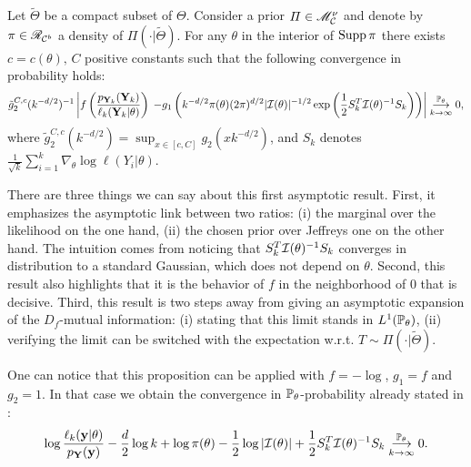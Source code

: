\begin{prop}
    Let $\tilde\Theta$ be a compact subset of $\Theta$.
    Consider a prior $\varPi\in\sM^\nu_\cC$ and denote by $\pi\in\sR_{\cC^b}$ a density of $\varPi(\cdot|\tilde\Theta)$.%
    For any $\theta$ in the interior of $\Supp\pi$ there exists $c=c(\theta),\,C$ positive constants such that the following convergence in probability holds:
    \begin{equation}
        \label{eq:cvinproba}
        \tilde g_2^{C,c}(k^{-d/2})^{-1}\left| f\left(\frac{p_{\mbf Y_k}(\mbf Y_k)}{\ell_k(\mbf Y_k|\theta)}\right) \right.            \left. - g_1\left(k^{-d/2}\pi(\theta)(2\pi)^{d/2}|\cI(\theta)|^{-1/2}\exp\left(\frac{1}{2}S_k^T\cI(\theta)^{-1}S_k \right)\right) \right| %
                \conv[\PP_{\theta}]{k\rightarrow\infty} 0,
    \end{equation}
    where $\tilde g_2^{C,c}(k^{-d/2})=\sup_{x\in[c,C]} g_2(xk^{-d/2})$, and $S_k$ denotes $\frac{1}{\sqrt{k}}\sum_{i=1}^k\nabla_\theta\log\ell(Y_i|\theta)$.
\end{prop}


There are three things we can say about this first asymptotic result. %
First, it emphasizes the asymptotic link {between two ratios: (i) the marginal over the likelihood on the one hand, (ii) the chosen prior over Jeffreys one on the other hand.}  
The intuition comes from noticing that $S_k^T\cI(\theta)^{-1}S_k$ converges in distribution to a standard Gaussian, which does not depend on $\theta$.
Second, 
this result also highlights that it is the behavior of $f$ in the neighborhood of $0$ that is decisive.
Third, this result is two steps away from giving an asymptotic expansion of the $D_f$-mutual information: (i) stating that this limit stands in $L^1(\PP_{\theta})$, (ii) verifying the limit can be switched with the expectation w.r.t. $T\sim\varPi(\cdot|\tilde\Theta)$.




One can notice that this proposition can be applied with $f=-\log$, $g_1=f$ and $g_2=1$. 
In that case we obtain the convergence in $\PP_\theta$-probability already stated in \cite{clarke_information-theoretic_1990}:
    \begin{equation}
        \log\frac{\ell_k(\mbf y|\theta)}{p_{\mbf Y}(\mbf y)} - \frac{d}{2}\log k + \log\pi(\theta) - \frac{1}{2}\log|\cI(\theta)| +\frac{1}{2}S_k^T\cI(\theta)^{-1}S_k  \conv[\PP_\theta]{k\rightarrow\infty} 0.
    \end{equation}







